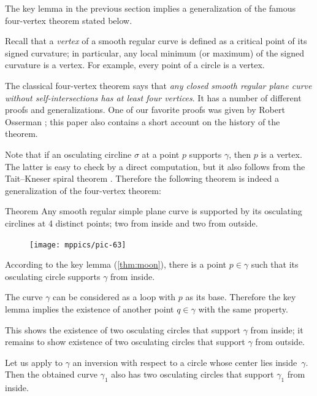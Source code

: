 \documentclass{article}
\begin{document}
The key lemma in the previous section implies a generalization of the famous four-vertex theorem stated below.

Recall that a \emph{vertex} of a smooth regular curve is defined as a critical point of its signed curvature;
in particular, any local minimum (or maximum) of the signed curvature is a vertex.
For example, every point of a circle is a vertex.

The classical four-vertex theorem says that \emph{any closed smooth regular plane curve without self-intersections has at least four vertices}.
It has a number of different proofs and generalizations.
One of our favorite proofs was given by Robert Osserman \cite{osserman}; this paper also contains a short account on the history of the theorem.

Note that if an osculating circline $\sigma$ at a point $p$ supports $\gamma$, then $p$ is a vertex.
The latter is easy to check by a direct computation, but it also follows from the Tait--Kneser spiral theorem \cite{ghys-tabachnikov-timorin}.
Therefore the following theorem is indeed a generalization of the four-vertex theorem:

\begin{thm}{Theorem}\label{thm:4-vert}
Any smooth regular simple plane curve is supported by its osculating circlines at 4 distinct points; two from inside and two from outside.
\end{thm}

\begin{figure}
\vskip-0mm
\centering
\texttt{[image: mppics/pic-63]}
\vskip0mm
\end{figure}

According to the key lemma (\ref{thm:moon}), there is a point $p\in\gamma$ such that its osculating circle supports $\gamma$ from inside.

The curve $\gamma$ can be considered as a loop with $p$ as its base.
Therefore the key lemma implies the existence of another point $q\in\gamma$ with the same property.

This shows the existence of two osculating circles that support $\gamma$ from inside;
it remains to show existence of two osculating circles that support $\gamma$ from outside.

Let us apply to $\gamma$ an inversion with respect to a circle whose center lies inside~$\gamma$.
Then the obtained curve $\gamma_1$ also has  two osculating circles that support $\gamma_1$ from inside.
\end{document}

